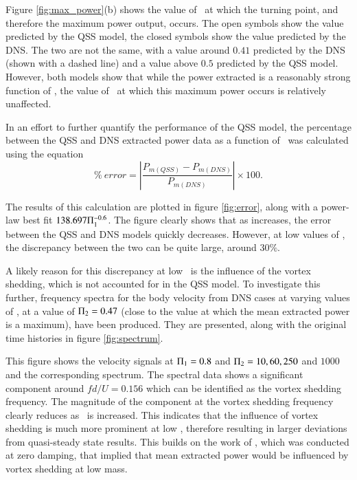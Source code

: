 Figure \ref{fig:max_power}(b) shows the value of \massdamp\ at which the turning point, and therefore the maximum power output, occurs. The open symbols show the value predicted by the QSS model, the closed symbols show the value predicted by the DNS. The two are not the same, with a value around $0.41$ predicted by the DNS (shown with a dashed line) and a value above $0.5$ predicted by the QSS model. However, both models show that while the power extracted is a reasonably strong function of \massstiff, the value of \massdamp\ at which this maximum power occurs is relatively unaffected.

In an effort to further quantify the performance of the QSS model, the percentage between the QSS and DNS extracted power data as a function of \massstiff\ was calculated using the equation
 \begin{equation}   \label{eqn:error_calculation} 
 \% \ error=\left|{\frac{P_{m(QSS)} - P_{m(DNS)}}{P_{m(DNS)}}}\right| \times 100.
 \end{equation}

The results of this calculation are plotted in figure \ref{fig:error}, along with a power-law best fit $138.697\Pi_1^{-0.6}$. The figure clearly shows that as \massstiff increases, the error between the QSS and DNS models quickly decreases. However, at low values of \massstiff, the discrepancy between the two can be quite large, around $30\%$.



A likely reason for this discrepancy at low \massstiff\ is the influence of the vortex shedding, which is not accounted for in the QSS model. To investigate this further, frequency spectra for the body velocity from DNS cases at varying values of \massstiff, at a value of $\Pi_2=0.47$ (close to the value at which the mean extracted power is a maximum), have been produced. They are presented, along with the original time histories in figure \ref{fig:spectrum}.


 
This figure shows the  velocity signals at $\Pi_1=0.8$ and $\Pi_2= 10, 60, 250$ and $1000$ and the corresponding spectrum. The spectral data shows a significant component around $fd/U=0.156$ which can be identified as the vortex shedding frequency. The magnitude of the component at the vortex shedding frequency clearly reduces as \massstiff\ is increased. This indicates that the influence of vortex shedding is much more prominent at low \massstiff,  therefore resulting in larger deviations from quasi-steady state results. This builds on the work of \cite{Joly2012}, which was conducted at zero damping, that implied that mean extracted power would be influenced by vortex shedding at low mass.

